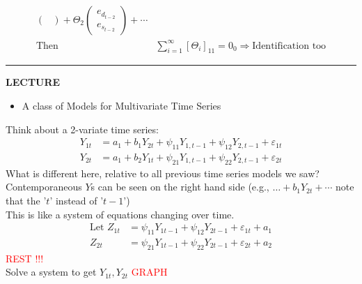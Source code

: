 \begin{itemize}
\begin{itemize}
\begin{itemize}
\begin{align*}
\begin{pmatrix}
                \end{pmatrix} + \Theta_2 \begin{pmatrix}
                    e_{d_{t-2}}\\
                    e_{s_{t-2}}
                \end{pmatrix} + \cdots \\
                \text{Then } &\sum_{i=1}^\infty \left[ \Theta_i \right]_{11} = 0_0 \Rightarrow \text{Identification too}
            \end{align*}
        \end{itemize}
    \end{itemize}
\end{itemize}



\rule{\textwidth}{0.4pt}
\textbf{LECTURE}


\begin{itemize}
    \item A class of Models for Multivariate Time Series 
\end{itemize}

Think about a 2-variate time series: 
\begin{align*}
    Y_{1t} &= a_1 + b_1Y_{2t} + \psi_{11} Y_{1,t-1} + \psi_{12} Y_{2,t-1} + \varepsilon_{1t} \\
    Y_{2t} &=  a_1 + b_2Y_{1t} + \psi_{21} Y_{1,t-1} + \psi_{22} Y_{2,t-1} + \varepsilon_{2t}
\end{align*}
What is different here, relative to all previous time series models we saw?\\

Contemporaneous $Y$s can be seen on the right hand side (e.g., $\dots +b_1 Y_{2t}+ \cdots$ note that the '$t$' instead of '$t-1$')\\

This is like a system of equations changing over time.  
\begin{align*}
    \text{Let } Z_{1t} &= \psi_{11}Y_{1t-1}+\psi_{12}Y_{2t-1} +\varepsilon_{1t} + a_1 \\
    Z_{2t} &= \psi_{21} Y_{1t-1} + \psi_{22} Y_{2t-1} + \varepsilon_{2t} + a_2
\end{align*}
\textcolor{red}{ REST !!!}\\

Solve a system to get $Y_{1t}, Y_{2t} $
\textcolor{red}{GRAPH} \\

